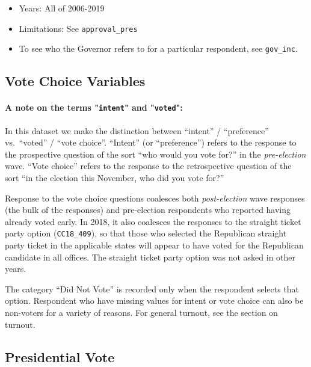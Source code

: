 \documentclass[10pt,article,oneside]{memoir}
\theoremstyle{definition}
\begin{document}
\begin{itemize}
\tightlist
\item
  Years: All of 2006-2019
\item
  Limitations: See \texttt{approval\_pres}
\item
  To see who the Governor refers to for a particular respondent, see
  \texttt{gov\_inc}.
\end{itemize}

\newpage

\hypertarget{vote-choice-variables}{%
\subsection{Vote Choice Variables}\label{vote-choice-variables}}

\paragraph{A note on the terms "\texttt{intent}" and "\texttt{voted}":}

In this dataset we make the distinction between ``intent'' /
``preference'' vs.~``voted'' / ``vote choice''. ``Intent'' (or
``preference'') refers to the response to the prospective question of
the sort ``who would you vote for?'' in the \emph{pre-election} wave.
``Vote choice'' refers to the response to the retrospective question of
the sort ``in the election this November, who did you vote for?''

Response to the vote choice questions coalesces both
\emph{post-election} wave responses (the bulk of the responses) and
pre-election respondents who reported having already voted early. In
2018, it also coalesces the responses to the straight ticket party
option (\texttt{CC18\_409}), so that those who selected the Republican
straight party ticket in the applicable states will appear to have voted
for the Republican candidate in all offices. The straight ticket party
option was not asked in other years.

The category ``Did Not Vote'' is recorded only when the respondent
selects that option. Respondent who have missing values for intent or
vote choice can also be non-voters for a variety of reasons. For general
turnout, see the section on turnout.

\hypertarget{presidential-vote}{%
\subsection{Presidential Vote}\label{presidential-vote}}
\end{document}
